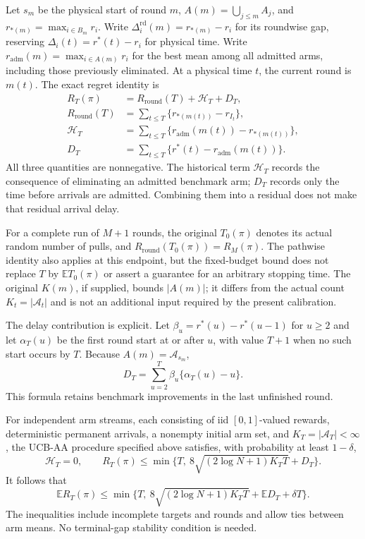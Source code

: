 \documentclass[11pt]{article}
\begin{document}
Let $s_m$ be the physical start of round $m$,
$A(m)=\bigcup_{j\le m}A_j$, and
$r_{*(m)}=\max_{i\in B_m}r_i$.
Write $\Delta_i^{\mathrm{rd}}(m)=r_{*(m)}-r_i$ for its roundwise gap,
reserving $\Delta_i(t)=r^*(t)-r_i$ for physical time.
Write $r_{\mathrm{adm}}(m)=\max_{i\in A(m)}r_i$ for the best mean
among all admitted arms, including those previously eliminated.
At a physical time $t$, the current round is $m(t)$. The exact regret
identity is
\begin{align}
 R_T(\pi)&=R_{\mathrm{round}}(T)+\mathcal H_T+D_T,\label{eq:ucbaa_main_decomposition}\\
 R_{\mathrm{round}}(T)
  &=\sum_{t\le T}\{r_{*(m(t))}-r_{I_t}\},\nonumber\\
 \mathcal H_T&=\sum_{t\le T}\{r_{\mathrm{adm}}(m(t))-r_{*(m(t))}\},\nonumber\\
 D_T&=\sum_{t\le T}\{r^*(t)-r_{\mathrm{adm}}(m(t))\}.\nonumber
\end{align}
All three quantities are nonnegative. The historical term $\mathcal H_T$ records
the consequence of eliminating an admitted benchmark arm; $D_T$ records
only the time before arrivals are admitted. Combining them into a residual
does not make that residual arrival delay.

For a complete run of $M+1$ rounds, the original $T_0(\pi)$ denotes its
actual random number of pulls, and
$R_{\mathrm{round}}(T_0(\pi))=R_M(\pi)$.
The pathwise identity also applies at this endpoint, but the fixed-budget
bound does not replace $T$ by $\mathbb E T_0(\pi)$ or assert a guarantee
for an arbitrary stopping time. The original $K(m)$, if supplied, bounds
$|A(m)|$; it differs from the actual count $K_t=|\mathcal A_t|$ and is
not an additional input required by the present calibration.

The delay contribution is explicit. Let
$\beta_u=r^*(u)-r^*(u-1)$ for $u\ge2$ and let $\alpha_T(u)$ be the
first round start at or after $u$, with value $T+1$ when no such start
occurs by $T$. Because $A(m)=\mathcal A_{s_m}$,
\begin{equation}
 D_T=\sum_{u=2}^T\beta_u\{\alpha_T(u)-u\}.
 \label{eq:ucbaa_main_delay}
\end{equation}
This formula retains benchmark improvements in the last unfinished round.

\begin{theorem}
\label{thm:ucbaa_main_fixed_budget}
For independent arm streams, each consisting of iid $[0,1]$-valued rewards,
deterministic permanent arrivals, a nonempty initial arm set, and
$K_T=|\mathcal A_T|<\infty$,
the UCB-AA procedure specified
above satisfies, with probability at least $1-\delta$,
\[
 \mathcal H_T=0,\qquad
 R_T(\pi)\le\min\{T,\ 8\sqrt{(2\log N+1)K_TT}+D_T\}.
\]
It follows that
\begin{equation}
 \mathbb E R_T(\pi)\le
 \min\{T,\ 8\sqrt{(2\log N+1)K_TT}
                  +\mathbb E D_T+\delta T\}.
 \label{eq:ucbaa_main_bound}
\end{equation}
The inequalities include incomplete targets and rounds and allow ties
between arm means. No terminal-gap stability condition is needed.
\end{theorem}
\end{document}
